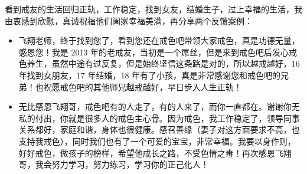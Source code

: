 \begin{case}
    看到戒友的生活回归正轨，工作稳定，找到女友，结婚生子，过上幸福的生活，我由衷感到欣慰，真诚祝福他们阖家幸福美满，再分享两个反馈案例：\begin{itemize}
        \item 飞翔老师，终于找到您了，看到您还在戒色吧带领大家戒色，真是功德无量，感恩您！我是 2013 年的老戒友，当初是一个屌丝，但是来到戒色吧后发心戒色养生，虽然中途有过反复，但是始终坚信这条路是对的，所以越戒越好，16 年找到女朋友，17 年结婚，18 年有了小孩，真是非常感谢您和戒色吧的兄弟！也祝愿戒色吧的其他师兄越戒越好，早日步入人生正轨！
        \item 无比感恩飞翔哥，戒色吧有的人走了，有的人来了，而你一直都在。谢谢你无私的付出，你就是很多人的戒色主心骨。因为戒色，我工作稳定了，领导同事关系都好，家庭和谐，身体也很健康。感召善缘（妻子对这方面要求不高，也支持我戒色），同时我们也有了一个可爱的宝宝，非常幸福。我要以身作则，好好戒色，做孩子的榜样，希望他成长之路，不受色情之毒！再次感恩飞翔哥，我会努力学习，努力练习，学习你的正己化人！
    \end{itemize}
\end{case}

